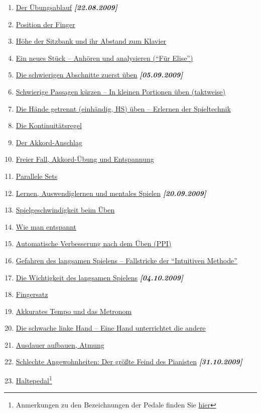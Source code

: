 \begin{enumerate} 
 \item \hyperref[c1ii1]{Der Übungsablauf} \textbf{\textit{[22.08.2009]}}
 \item \hyperref[c1ii2]{Position der Finger}
 \item \hyperref[c1ii3]{Höhe der Sitzbank und ihr Abstand zum Klavier}
 \item \hyperref[c1ii4]{Ein neues Stück -- Anhören und analysieren (\enquote{Für Elise})}
 \item \hyperref[c1ii5]{Die schwierigen Abschnitte zuerst üben}  \textbf{\textit{[05.09.2009]}}
 \item \hyperref[c1ii6]{Schwierige Passagen kürzen -- In kleinen Portionen üben (taktweise)}
 \item \hyperref[c1ii7]{Die Hände getrennt (einhändig, HS) üben -- Erlernen der Spieltechnik}
 \item \hyperref[c1ii8]{Die Kontinuitätsregel}
 \item \hyperref[c1ii9]{Der Akkord-Anschlag}
 \item \hyperref[c1ii10]{Freier Fall, Akkord-Übung und Entspannung}
 \item \hyperref[c1ii11]{Parallele Sets}
 \item \hyperref[c1ii12]{Lernen, Auswendiglernen und mentales Spielen} \textbf{\textit{[20.09.2009]}}
 \item \hyperref[c1ii13]{Spielgeschwindigkeit beim Üben}
 \item \hyperref[c1ii14]{Wie man entspannt}
 \item \hyperref[c1ii15]{Automatische Verbesserung nach dem Üben (PPI)}
 \item \hyperref[c1ii16]{Gefahren des langsamen Spielens -- Fallstricke der \enquote{Intuitiven Methode}}
 \item \hyperref[c1ii17]{Die Wichtigkeit des langsamen Spielens} \textbf{\textit{[04.10.2009]}}

 \item \hyperref[c1ii18]{Fingersatz}
 \item \hyperref[c1ii19]{Akkurates Tempo und das Metronom}
 \item \hyperref[c1ii20]{Die schwache linke Hand -- Eine Hand unterrichtet die andere}
 \item \hyperref[c1ii21]{Ausdauer aufbauen, Atmung}

 \item \hyperref[c1ii22]{Schlechte Angewohnheiten: Der größte Feind des Pianisten} \textbf{\textit{[31.10.2009]}}
 \item \hyperref[c1ii23]{Haltepedal}\footnote{Anmerkungen zu den Bezeichnungen der Pedale finden Sie \hyperref[Pedale]{hier}}
 

\end{enumerate}
